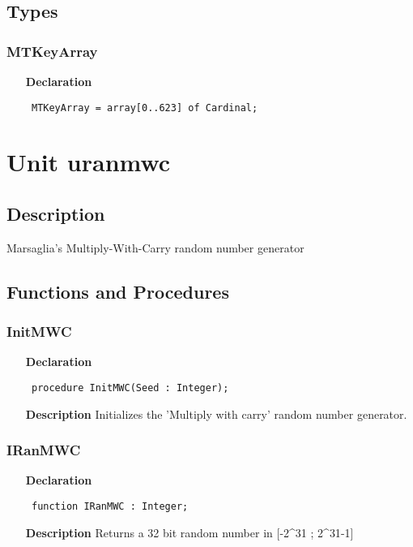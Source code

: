 \documentclass[12pt,a4paper,oneside]{report}
\newcommand{\declarationitem}[1]{\textbf{#1}}
\newcommand{\descriptiontitle}[1]{\textbf{#1}}
\newcommand{\code}[1]{\texttt{#1}}
\begin{document}
\subsection{Types}
\subsubsection{MTKeyArray}
\label{uranmt-MTKeyArray}
\begin{itemize}\item[\declarationitem{Declaration}\hfill]
	\begin{flushleft}
		\code{
			MTKeyArray = array[0..623] of Cardinal;}
		
	\end{flushleft}
	
\end{itemize}
\section{Unit uranmwc}
\label{uranmwc}
\subsection{Description}
Marsaglia's Multiply{-}With{-}Carry random number generator 
\subsection{Functions and Procedures}
\subsubsection{InitMWC}
\label{uranmwc-InitMWC}
\begin{itemize}\item[\declarationitem{Declaration}\hfill]
	\begin{flushleft}
		\code{
			procedure InitMWC(Seed : Integer);}
		
	\end{flushleft}
	
	\par
	\item[\descriptiontitle{Description}]
	Initializes the 'Multiply with carry' random number generator.
	
\end{itemize}
\subsubsection{IRanMWC}
\label{uranmwc-IRanMWC}
\begin{itemize}\item[\declarationitem{Declaration}\hfill]
	\begin{flushleft}
		\code{
			function IRanMWC : Integer;}
		
	\end{flushleft}
	
	\par
	\item[\descriptiontitle{Description}]
	Returns a 32 bit random number in [{-}2{\^{}}31 ; 2{\^{}}31{-}1]
	
\end{itemize}
\end{document}

